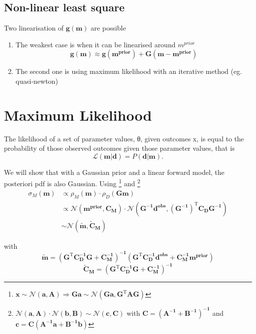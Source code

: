 \documentclass[twocolumn]{article}
\numberwithin{equation}{section}
\begin{document}
	\subsection{Non-linear least square}
Two linearisation of $\mathbf{g(m)}$ are possible
\begin{enumerate}
	\item The weakest case is when it can be linearised around $m^{prior}$
	$$\mathbf{g(m)\approx g(m^{prior}) + G(m-m^{prior})}$$
	\item The second one is using maximum likelihood with an iterative method (eg. quasi-newton)
\end{enumerate}
\newpage



















\newpage
\section{Maximum Likelihood}
The likelihood of a set of parameter values, θ, given outcomes x, is equal to the probability of those observed outcomes given those parameter values, that is
$$\mathcal{L}(\mathbf{m} |\mathbf{d}) = P(\mathbf{d} | \mathbf{m}).$$


We will show that with a Gaussian prior and a linear forward model, the posteriori pdf is also Gaussian. Using \footnote{$\mathbf{x \sim \mathcal{N} (a,A)  \Rightarrow Ga \sim \mathcal{N} (Ga,G^\mathrm{T}AG)}$} and \footnote{$\mathbf{\mathcal{N} (a,A) \cdot \mathcal{N} (b,B)  \sim \mathcal{N} (c,C)}$ with $\mathbf{C=(A^{-1}+B^{-1})^{-1}}$ and $\mathbf{c=C(A^{-1}a + B^{-1}b)}$}
\begin{align*}
\sigma_M(\mathbf{m})& \propto  \rho_M(\mathbf{m}) \cdot \rho_D(\mathbf{Gm})\\
					& \propto  \mathbf{\mathcal{N}(m^{prior},C_M)  \cdot \mathcal{N} (G^{-1}d^{obs},(G^{-1})^\mathrm{T}C_DG^{-1})} \\
					& \sim  \mathcal{N} \mathbf{  (\tilde{m},\tilde{C}_M) }
\end{align*}

with 
$$\mathbf{\tilde{m}=(G^\mathrm{T}C_D^{-1}G+C_M^{-1})^{-1} (G^\mathrm{T}C_D^{-1}d^{obs}+C_M^{-1}m^{prior})}$$
$$\mathbf{\tilde{C}_M=(G^\mathrm{T}C_D^{-1}G+C_M^{-1})^{-1}}$$
\end{document}

